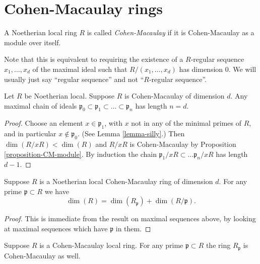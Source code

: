 \section{Cohen-Macaulay rings}
\label{section-CM-ring}

\begin{definition}
\label{definition-local-ring-CM}
A Noetherian local ring $R$ is called {\it Cohen-Macaulay}
if it is Cohen-Macaulay as a module over itself.
\end{definition}

\noindent
Note that this is equivalent to requiring the existence
of a $R$-regular sequence $x_1,\ldots,x_d$ of the maximal
ideal such that $R/(x_1,\ldots,x_d)$ has dimension $0$.
We will usually just say ``regular sequence'' and not
``$R$-regular sequence''.

\begin{lemma}
\label{lemma-maximal-chain-CM}
Let $R$ be Noetherian local.
Suppose $R$ is Cohen-Macaulay of dimension $d$.
Any maximal chain of ideals $\mathfrak p_0 \subset
\mathfrak p_1 \subset \ldots \subset \mathfrak p_n$
has length $n = d$.
\end{lemma}

\begin{proof}
Choose an element $x \in \mathfrak p_1$, with $x$ not in
any of the minimal primes of $R$, and in particular
$x \not \in \mathfrak p_0$. (See Lemma \ref{lemma-silly}.)
Then $\dim (R/xR) < \dim (R)$ and $R/xR$ is Cohen-Macaulay
by Proposition \ref{proposition-CM-module}. By induction
the chain $\mathfrak p_1/xR \subset \ldots \mathfrak p_n/xR$
has length $d - 1$.
\end{proof}

\begin{lemma}
\label{lemma-CM-dim-formula}
Suppose $R$ is a Noetherian local Cohen-Macaulay ring of dimension $d$.
For any prime $\mathfrak p \subset R$ we have
$$
\dim(R) = \dim(R_{\mathfrak p}) + \dim(R/\mathfrak p).
$$
\end{lemma}

\begin{proof}
This is immediate from the result on maximal sequences
above, by looking at maximal sequences which have $\mathfrak p$
in them.
\end{proof}

\begin{lemma}
\label{lemma-localize-CM}
Suppose $R$ is a Cohen-Macaulay local ring.
For any prime $\mathfrak p \subset R$ the
ring $R_{\mathfrak p}$ is Cohen-Macaulay as well.
\end{lemma}

